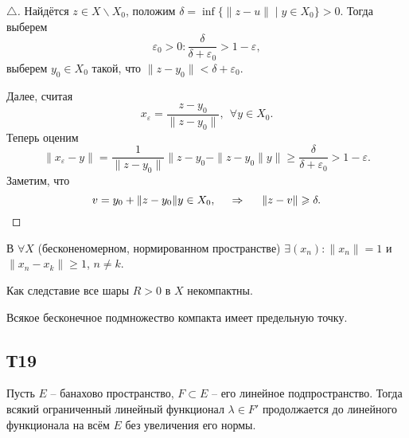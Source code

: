 \begin{proof}[$\triangle$]
    Найдётся $z \in X \backslash X_0$, положим $\delta = \inf\{
        \|z - u\| \mid y \in X_0
    \} > 0$.
    Тогда выберем
    \begin{equation*}
        \varepsilon_0 > 0 \colon  \frac{\delta}{\delta+\varepsilon_0} > 1 - \varepsilon,
    \end{equation*}
    выберем $y_0 \in X_0$ такой, что $\|z - y_0\| < \delta + \varepsilon_0$.

    Далее, считая
    \begin{equation*}
        x_\varepsilon = \frac{z-y_0}{\|z-y_0\|}, \  \ \forall y \in X_0.
    \end{equation*}
    Теперь оценим
    \begin{equation*}
        \|x_\varepsilon - y\| = \frac{1}{\|z-y_0\|} \|z-y_0-\|z-y_0\|y\| \geq \frac{\delta}{\delta+\varepsilon_0} > 1 - \varepsilon.
    \end{equation*}
    Заметим, что
    \begin{equation*}
        v = y_0 + \|z-y_0\| y \in X_0,
        \hspace{0.5cm} \Rightarrow \hspace{0.5cm}
        \|z-v\| \geq \delta.
    \end{equation*}
\end{proof}



\begin{to_con}
    В $\forall X$  (бесконеномерном, нормированном пространстве) $\exists (x_n) \colon  \|x_n\| = 1$ и
    $\|x_n - x_k\| \geq 1$, $n \neq k$.
\end{to_con}

Как следставие все шары $R > 0$ в $X$ некомпактны. 

Всякое бесконечное подмножество компакта имеет предельную точку. 





\subsection*{Т19}



\begin{to_thr}
    Пусть $E$ -- банахово пространство, $F \subset E$ -- его линейное подпространство. Тогда всякий ограниченный линейный функционал $\lambda \in F'$ продолжается до линейного функционала на всём $E$ без увеличения его нормы.
\end{to_thr}


